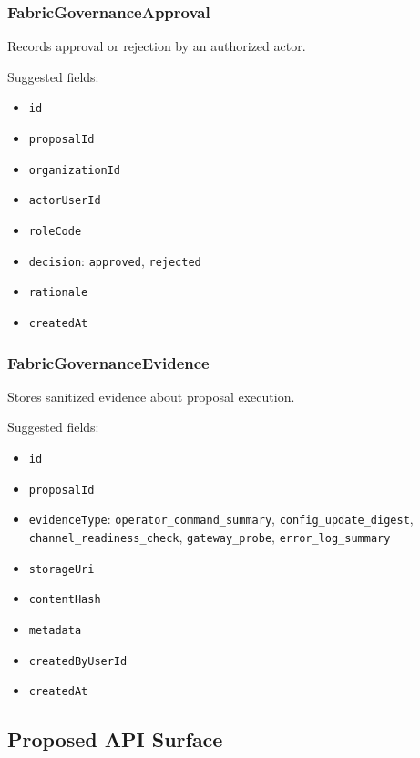 \subsubsection{FabricGovernanceApproval}

Records approval or rejection by an authorized actor.

Suggested fields:

\begin{itemize}
  \item \texttt{id}
  \item \texttt{proposalId}
  \item \texttt{organizationId}
  \item \texttt{actorUserId}
  \item \texttt{roleCode}
  \item \texttt{decision}: \texttt{approved}, \texttt{rejected}
  \item \texttt{rationale}
  \item \texttt{createdAt}
\end{itemize}

\subsubsection{FabricGovernanceEvidence}

Stores sanitized evidence about proposal execution.

Suggested fields:

\begin{itemize}
  \item \texttt{id}
  \item \texttt{proposalId}
  \item \texttt{evidenceType}: \texttt{operator\_command\_summary}, \texttt{config\_update\_digest}, \texttt{channel\_readiness\_check}, \texttt{gateway\_probe}, \texttt{error\_log\_summary}
  \item \texttt{storageUri}
  \item \texttt{contentHash}
  \item \texttt{metadata}
  \item \texttt{createdByUserId}
  \item \texttt{createdAt}
\end{itemize}

\subsection{Proposed API Surface}

